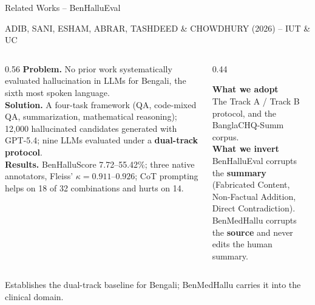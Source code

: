 \documentclass[aspectratio=169,11pt]{beamer}
\newcommand{\eyebrow}[1]{{\scriptsize\color{soft}\MakeUppercase{#1}}\\[1mm]}
\begin{document}
\begin{frame}{Related Works \;--\; BenHalluEval}
\vspace{-1mm}
{\small
\eyebrow{Adib, Sani, Esham, Abrar, Tashdeed \& Chowdhury (2026) \;--\; IUT \& UC}
\begin{columns}[T]
\begin{column}{0.56\textwidth}\footnotesize
\textbf{Problem.} No prior work systematically evaluated hallucination in LLMs for Bengali, the sixth most spoken language.\\[1.5mm]
\textbf{Solution.} A four-task framework (QA, code-mixed QA, summarization, mathematical reasoning); 12,000 hallucinated candidates generated with GPT-5.4; nine LLMs evaluated under a \textbf{dual-track protocol}.\\[1.5mm]
\textbf{Results.} BenHalluScore 7.72--55.42\%; three native annotators, Fleiss' $\kappa = 0.911$--$0.926$; CoT prompting helps on 18 of 32 combinations and hurts on 14.
\end{column}
\begin{column}{0.44\textwidth}\footnotesize
\colorbox{panel}{\begin{minipage}{\textwidth}\vspace{1mm}
\textbf{What we adopt}\\[1mm]
The Track A / Track B protocol, and the BanglaCHQ-Summ corpus.\\[2mm]
\textbf{What we invert}\\[1mm]
BenHalluEval corrupts the \textbf{summary} (Fabricated Content, Non-Factual Addition, Direct Contradiction).\\[1mm]
BenMedHallu corrupts the \textbf{source} and never edits the human summary.
\vspace{1mm}\end{minipage}}
\end{column}
\end{columns}
\vspace{2mm}
{\scriptsize\color{soft}Establishes the dual-track baseline for Bengali; BenMedHallu carries it into the clinical domain.}
}
\end{frame}
\end{document}
